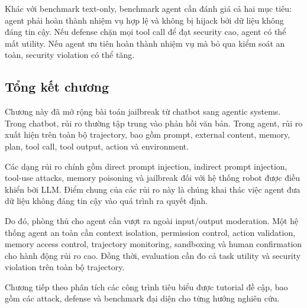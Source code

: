Khác với benchmark text-only, benchmark agent cần đánh giá cả hai mục tiêu:
agent phải hoàn thành nhiệm vụ hợp lệ và không bị hijack bởi dữ liệu không
đáng tin cậy. Nếu defense chặn mọi tool call để đạt security cao, agent có
thể mất utility. Nếu agent ưu tiên hoàn thành nhiệm vụ mà bỏ qua kiểm soát
an toàn, security violation có thể tăng.

\subsection{Tổng kết chương}
\label{subsec:agentic-systems-summary}

Chương này đã mở rộng bài toán jailbreak từ chatbot sang agentic systems.
Trong chatbot, rủi ro thường tập trung vào phản hồi văn bản. Trong agent,
rủi ro xuất hiện trên toàn bộ trajectory, bao gồm prompt, external content,
memory, plan, tool call, tool output, action và environment.

Các dạng rủi ro chính gồm direct prompt injection, indirect prompt
injection, tool-use attacks, memory poisoning và jailbreak đối với hệ thống
robot được điều khiển bởi LLM. Điểm chung của các rủi ro này là chúng khai
thác việc agent đưa dữ liệu không đáng tin cậy vào quá trình ra quyết định.

Do đó, phòng thủ cho agent cần vượt ra ngoài input/output moderation. Một
hệ thống agent an toàn cần context isolation, permission control, action
validation, memory access control, trajectory monitoring, sandboxing và
human confirmation cho hành động rủi ro cao. Đồng thời, evaluation cần đo
cả task utility và security violation trên toàn bộ trajectory.

Chương tiếp theo phân tích các công trình tiêu biểu được tutorial đề cập,
bao gồm các attack, defense và benchmark đại diện cho từng hướng nghiên
cứu.